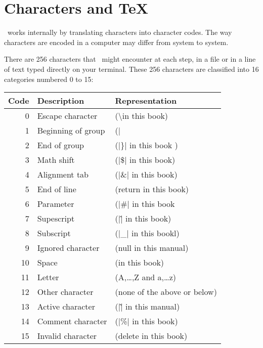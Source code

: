 \chapter{Characters and TeX}


\normalsize

\tex\ works internally by translating characters into character codes. The way characters are encoded in a computer
may differ from system to system.


There are 256 characters that \tex\  might encounter at
each step, in a file or in a line of text typed directly on your terminal. These
256 characters are classified into 16 categories numbered 0 to 15:



\begin{table}[htbp]
\centering
\begin{tabular}{rll}
\toprule
Code & Description & Representation\\
\midrule
0 & Escape character & (\textbackslash in this book)\\
1 & Beginning of group & (|{| in this book)\\
2 & End of group & (|\}| in this book )\\
3 & Math shift & (|\$| in this book)\\
4 & Alignment tab & (|\&| in this book)\\
5 & End of line &(return in this book)\\
6 & Parameter &(|\#| in this book\\
7 & Supescript &(|\^| in this book)\\
8 & Subscript &(|\_| in this bookl)\\
9 & Ignored character &(null in this manual)\\
10 & Space &(\textvisiblespace in this book)\\
11 &Letter &(A,\ldots,Z and a,\ldots z)\\
12 &Other character &(none of the above or below)\\
13 &Active character &(|\~| in this manual)\\
14 &Comment character &(|\%| in this book)\\
15 &Invalid character &(delete in this book)\\
\bottomrule
\end{tabular}
\end{table}
\medskip

